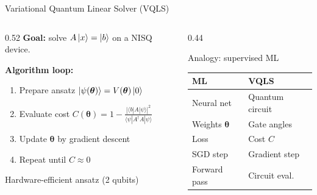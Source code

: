 \documentclass{beamer}
\begin{document}
\begin{frame}{Variational Quantum Linear Solver (VQLS)}

  \begin{columns}
    \begin{column}{0.52\textwidth}
      \textbf{Goal:} solve $A\ket{x} = \ket{b}$ on a NISQ device.

      \vspace{6pt}
      \textbf{Algorithm loop:}
      \begin{enumerate}
        \item Prepare ansatz $\ket{\psi(\boldsymbol\theta)}=V(\boldsymbol\theta)\ket{0}$
        \item Evaluate cost $C(\boldsymbol\theta)=1-\tfrac{|\langle b|A|\psi\rangle|^2}
              {\langle\psi|A^\dagger A|\psi\rangle}$
        \item Update $\boldsymbol\theta$ by gradient descent
        \item Repeat until $C\approx 0$
      \end{enumerate}

      \vspace{6pt}
      \begin{center}
      \vspace{1pt}
      {\scriptsize Hardware-efficient ansatz (2 qubits)}
      \end{center}
    \end{column}
    \begin{column}{0.44\textwidth}
      \begin{block}{Analogy: supervised ML}
        {\footnotesize\renewcommand{\arraystretch}{1.05}%
        \begin{tabular}{ll}
          ML & VQLS \\ \hline
          Neural net & Quantum circuit \\
          Weights $\boldsymbol\theta$ & Gate angles \\
          Loss & Cost $C$ \\
          SGD step & Gradient step \\
          Forward pass & Circuit eval.
        \end{tabular}}
      \end{block}


\end{column}
\end{columns}
\end{frame}
\end{document}
